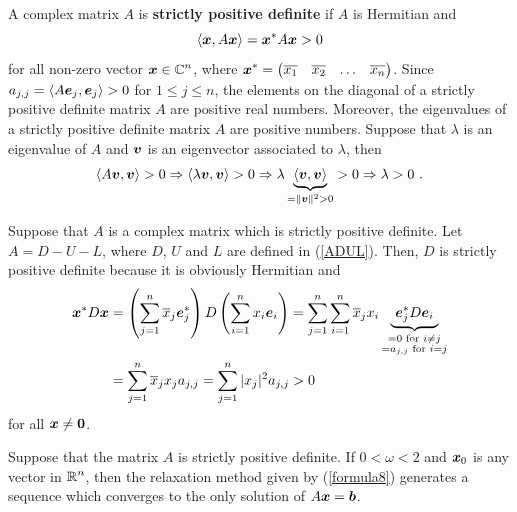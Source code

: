 A \nn complex matrix $A$ is
{\bfseries strictly positive definite} if $A$ is Hermitian and 
\[
\left\langle{\bm{x}} , {A\bm{x}}\right\rangle = \bm{x}^{\ast} A \bm{x} > 0
\]
for all non-zero vector $\displaystyle \bm{x} \in \mathbb{C}^n$, where
$\displaystyle \bm{x}^{\ast} = 
\begin{pmatrix} \overline{x_1} & \overline{x_2} & \ldots & \overline{x_n}
\end{pmatrix}$.  Since
$a_{j,j} = \left\langle{A\bm{e}_j} , {\bm{e}_j}\right\rangle > 0$ for $1\leq j \leq n$,
the elements on the diagonal of a strictly positive definite matrix $A$ are
positive real numbers.  Moreover, the eigenvalues of a strictly positive
definite matrix $A$ are positive numbers.  Suppose that
$\lambda$ is an eigenvalue of $A$ and $\bm{v}$ is an eigenvector
associated to $\lambda$, then
\[
\left\langle{A\bm{v}} , {\bm{v}}\right\rangle > 0
\Rightarrow \left\langle{\lambda \bm{v}} , {\bm{v}}\right\rangle > 0  
\Rightarrow \lambda \underbrace{\left\langle{\bm{v}} , {\bm{v}}\right\rangle}_{=\|\bm{v}\|^2>0} > 0  
\Rightarrow \lambda > 0 \ .
\]

\begin{rmk}
Suppose that $A$ is a \nn complex matrix which is strictly
positive definite.  Let $A = D - U - L$, where $D$, $U$ and $L$ are
defined in (\ref{ADUL}).  Then, $D$ is strictly positive definite
because it is obviously Hermitian and 
\begin{align*}
\bm{x}^{\ast} D \bm{x} &=
\left(\sum_{j=1}^n\overline{x}_j\bm{e}_j^\ast \right) D
\left(\sum_{i=1}^n x_i\bm{e}_i \right)
= \sum_{j=1}^n \sum_{i=1}^n \overline{x}_j x_i
\underbrace{\ \bm{e}_j^\ast D \bm{e}_i\ }_{\substack{=0\text{ for }
i\neq j\\=a_{j,j} \text{ for } i=j}} \\
&= \sum_{j=1}^n \overline{x}_j x_j a_{j,j}
= \sum_{j=1}^n |x_j|^2 a_{j,j} > 0
\end{align*}
for all $\bm{x} \neq \bm{0}$.
\label{spd_rmk}
\end{rmk}

\begin{theorem}
Suppose that the \nn matrix $A$ is strictly positive
definite.   If $0 < \omega < 2$ and $\bm{x}_{0}$ is any vector in
$\displaystyle \mathbb{R}^n$, then the relaxation method given by (\ref{formula8})
generates a sequence which converges to the only solution of
$A\bm{x} = \bm{b}$. 
\label{wconv}
\end{theorem}

